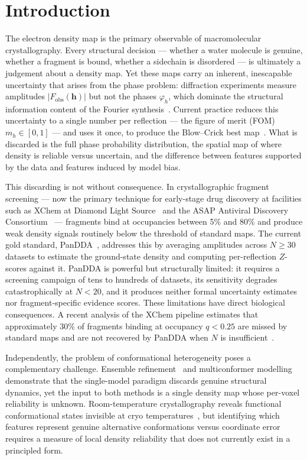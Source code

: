 \documentclass[10pt,twocolumn]{article}
\newcommand{\Fobs}{F_{\!\mathrm{obs}}}
\newcommand{\boldh}{\mathbf{h}}
\begin{document}
\section{Introduction}

The electron density map is the primary observable of macromolecular
crystallography.  Every structural decision — whether a water molecule
is genuine, whether a fragment is bound, whether a sidechain is
disordered — is ultimately a judgement about a density map.
Yet these maps carry an inherent, inescapable uncertainty that arises
from the phase problem: diffraction experiments measure amplitudes
$|\Fobs(\boldh)|$ but not the phases $\varphi_h$, which dominate the
structural information content of the Fourier synthesis~\cite{blow1959}.
Current practice reduces this uncertainty to a single number per
reflection — the figure of merit (FOM) $m_h \in [0,1]$ — and uses
it once, to produce the Blow--Crick best map~\cite{blow1959}.
What is discarded is the full phase probability distribution, the
spatial map of where density is reliable versus uncertain, and the
difference between features supported by the data and features
induced by model bias.

This discarding is not without consequence.  In crystallographic
fragment screening — now the primary technique for early-stage
drug discovery at facilities such as XChem at Diamond Light
Source~\cite{krojer2021} and the ASAP Antiviral Discovery
Consortium~\cite{asap2022} — fragments bind at occupancies between
5\% and 80\% and produce weak density signals routinely below the
threshold of standard maps.  The current gold standard,
PanDDA~\cite{pearce2017}, addresses this by averaging amplitudes
across $N \geq 30$ datasets to estimate the ground-state density
and computing per-reflection $Z$-scores against it.  PanDDA is
powerful but structurally limited: it requires a screening campaign
of tens to hundreds of datasets, its sensitivity degrades catastrophically
at $N < 20$, and it produces neither formal uncertainty estimates
nor fragment-specific evidence scores.
These limitations have direct biological consequences.
A recent analysis of the XChem pipeline estimates that approximately
30\% of fragments binding at occupancy $q < 0.25$ are missed by
standard maps and are not recovered by PanDDA when $N$ is
insufficient~\cite{krojer2023}.

Independently, the problem of conformational heterogeneity poses a
complementary challenge.  Ensemble refinement~\cite{burnley2012} and
multiconformer modelling~\cite{vandenberghe2009} demonstrate that
the single-model paradigm discards genuine structural dynamics, yet
the input to both methods is a single density map whose per-voxel
reliability is unknown.  Room-temperature crystallography
reveals functional conformational states invisible at cryo
temperatures~\cite{fraser2011}, but identifying which features
represent genuine alternative conformations versus coordinate error
requires a measure of local density reliability that does not
currently exist in a principled form.
\end{document}

